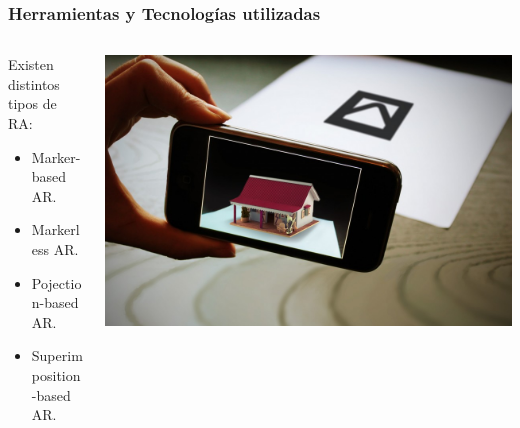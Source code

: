 \begin{frame}
	\frametitle{Herramientas y Tecnologías utilizadas}
	\begin{columns}
			\begin{column}{0.45\textwidth}
					Existen distintos tipos de RA:
					\begin{itemize}
						\item {Marker-based AR.}
						\item {Markerless AR.}
						\item {Pojection-based AR.}
						\item {Superimposition-based AR.}
					\end{itemize}
				\endblock{}
			\end{column}
			\begin{column}{0.55\textwidth}
				\vfill 
					\begin{center}
						\includegraphics[width=0.95\linewidth]{Images/marker-ar}
					\end{center}
			\end{column}
	\end{columns}
\end{frame}


